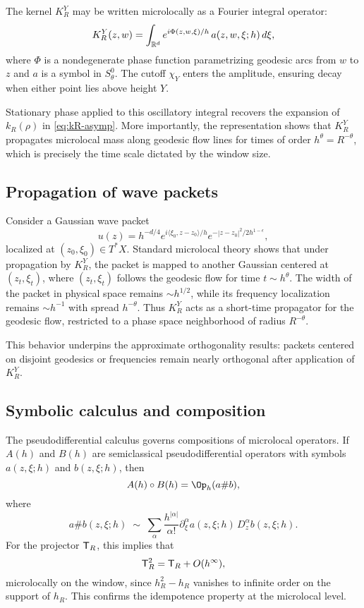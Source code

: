 The kernel $K_R^Y$ may be written microlocally as a Fourier integral operator:
\[
K_R^Y(z,w) = \int_{\mathbb{R}^d} e^{i\Phi(z,w,\xi)/h}\, a(z,w,\xi;h)\, d\xi,
\]
where $\Phi$ is a nondegenerate phase function parametrizing geodesic arcs from $w$ to $z$ and $a$ is a symbol in $S^0_\theta$. The cutoff $\chi_Y$ enters the amplitude, ensuring decay when either point lies above height $Y$.

Stationary phase applied to this oscillatory integral recovers the expansion of $k_R(\rho)$ in \eqref{eq:kR-asymp}. More importantly, the representation shows that $K_R^Y$ propagates microlocal mass along geodesic flow lines for times of order $h^\theta = R^{-\theta}$, which is precisely the time scale dictated by the window size.

\subsection{Propagation of wave packets}\label{subsec:micro-wavepackets}

Consider a Gaussian wave packet
\[
u(z) = h^{-d/4} e^{i\langle \xi_0, z-z_0\rangle/h} e^{-|z-z_0|^2/2h^{1-\epsilon}},
\]
localized at $(z_0,\xi_0)\in T^*X$. Standard microlocal theory shows that under propagation by $K_R^Y$, the packet is mapped to another Gaussian centered at $(z_t,\xi_t)$, where $(z_t,\xi_t)$ follows the geodesic flow for time $t\sim h^\theta$. The width of the packet in physical space remains $\sim h^{1/2}$, while its frequency localization remains $\sim h^{-1}$ with spread $h^{-\theta}$. Thus $K_R^Y$ acts as a short-time propagator for the geodesic flow, restricted to a phase space neighborhood of radius $R^{-\theta}$.

This behavior underpins the approximate orthogonality results: packets centered on disjoint geodesics or frequencies remain nearly orthogonal after application of $K_R^Y$.

\subsection{Symbolic calculus and composition}\label{subsec:micro-calculus}

The pseudodifferential calculus governs compositions of microlocal operators. If $A(h)$ and $B(h)$ are semiclassical pseudodifferential operators with symbols $a(z,\xi;h)$ and $b(z,\xi;h)$, then
\[
A(h)\circ B(h) = \Op_h(a\# b),
\]
where
\[
a\# b (z,\xi;h) \;\sim\; \sum_{\alpha} \frac{h^{|\alpha|}}{\alpha!} \partial_\xi^\alpha a(z,\xi;h) \, D_z^\alpha b(z,\xi;h).
\]
For the projector $\mathsf{T}_R$, this implies that
\[
\mathsf{T}_R^2 = \mathsf{T}_R + O(h^\infty),
\]
microlocally on the window, since $h_R^2-h_R$ vanishes to infinite order on the support of $h_R$. This confirms the idempotence property at the microlocal level.


